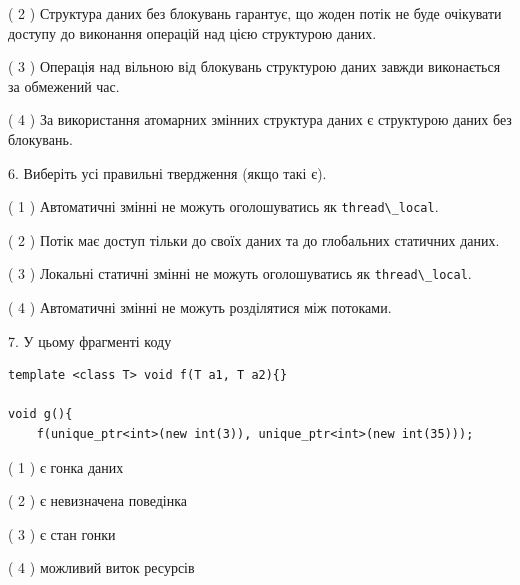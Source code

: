 \documentclass[12pt, ukrainian]{article}
\def\code#1{\Verb!#1!}
\begin{document}
\begin {large}
{( 2 ) Структура даних без блокувань гарантує, що жоден потік не буде очікувати доступу до виконання операцій над цією структурою даних.%

( 3 ) Операція над вільною від блокувань структурою даних завжди виконається за обмежений час.%

( 4 ) За використання атомарних змінних структура даних є структурою даних без блокувань.%
\newpage



\vspace{5mm}
6. Виберіть усі правильні твердження (якщо такі є).\par
\vspace{2mm}

( 1 ) Автоматичні змінні не можуть оголошуватись як \code{thread\_local}.%

( 2 ) Потік має доступ тільки до своїх даних та до глобальних статичних даних.%

( 3 ) Локальні статичні змінні не можуть оголошуватись як \code{thread\_local}.%

( 4 ) Автоматичні змінні не можуть розділятися між потоками.%


\vspace{5mm}
7. У цьому фрагменті коду
\begin{verbatim}
template <class T> void f(T a1, T a2){}

void g(){
    f(unique_ptr<int>(new int(3)), unique_ptr<int>(new int(35)));
\end{verbatim}

( 1 ) є гонка даних%

( 2 ) є невизначена поведінка%

( 3 ) є стан гонки%

( 4 ) можливий виток ресурсів%
}
\end {large}
\end{document}
